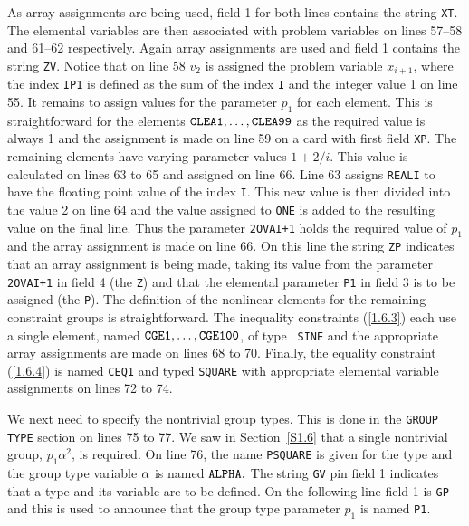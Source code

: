 \documentclass[a4paper]{article}
\newcommand{\req}[1]{(\ref{#1})}
\begin{document}
As array
assignments are being used,  field 1 for  both lines contains
the string {\tt XT}.
The elemental variables
are then associated with
problem variables
on lines 57--58 and 61--62 respectively. Again array
assignments are used and field 1 contains the string {\tt ZV}.
Notice  that   on  line 58 $v_2$   is  assigned  the  problem variable
$x_{i+1}$, where the  index {\tt IP1} is   defined as  the sum of  the
index {\tt I}  and  the integer  value 1  on line  55.  It remains  to
assign values    for the parameter $p_1$  for   each element.
This is
straightforward for the elements  ${\tt  CLEA1,\ldots, CLEA99}$ as the
required value is always 1 and the assignment is made on  line 59 on a
card
with first field {\tt XP}.
The  remaining elements  have varying parameter
values ${1 +  2/i}$.
This value is  calculated on lines  63 to 65 and  assigned on line 66.
Line 63 assigns  {\tt REALI} to have  the  floating point value of the
index {\tt I}.  This  new value is then divided  into the value  2  on
line 64 and the value assigned to {\tt ONE}  is added to the resulting
value on  the final line.  Thus  the parameter
{\tt 2OVAI+1} holds the
required value of $p_1$ and the  array
assignment is  made on line 66.
On this line the string {\tt ZP} indicates that an array
assignment is
being made, taking its value from the parameter  {\tt 2OVAI+1} in field
4 (the {\tt Z}) and that the elemental parameter
{\tt  P1} in field 3
is to  be assigned (the  {\tt  P}).  The  definition of the  nonlinear
elements for the remaining constraint
groups is straightforward. The inequality constraints
\req{1.6.3} each
use a single element, named
${\tt CGE1,\ldots,  CGE100}$, of type {\tt
SINE}  and the appropriate  array
assignments are made on  lines 68 to
70.  Finally, the equality constraint
\req{1.6.4} is  named {\tt CEQ1}
and typed {\tt SQUARE} with appropriate elemental variable
assignments on lines 72 to 74.

We next need to specify  the nontrivial group  types.
This is done in
the  {\tt  GROUP   TYPE}
section  on   lines   75   to 77.  We  saw in
Section~\ref{S1.6}    that  a    single nontrivial   group,  $p_1
\alpha^2$, is required. On  line 76, the  name {\tt PSQUARE} is given
for the type and the group type variable ${\tt \alpha}$ is named ${\tt
ALPHA.}$ The string {\tt GV}
pin field 1 indicates that a type  and its
variable are to be defined. On the following line field 1  is {\tt GP}
and this is used to announce that the group type parameter
$p_1$ is named {\tt P1}.
\end{document}
